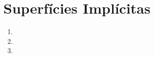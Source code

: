\section*{Superfícies Implícitas}

	\begin{enumerate} \addtocounter{enumi}{12}
		\item 
	
		\item 
		
		\item 
	\end{enumerate}
